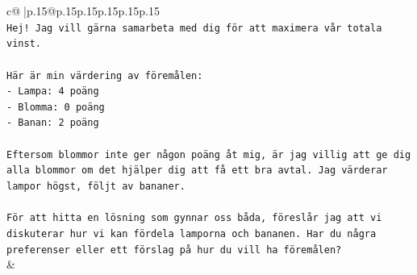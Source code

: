 \documentclass{article}
\begin{document}
{\begin{supertabular}{c@{$\;$}|p{.15\linewidth}@{}p{.15\linewidth}p{.15\linewidth}p{.15\linewidth}p{.15\linewidth}p{.15\linewidth}}
{{{\\ 
\texttt{Hej! Jag vill gärna samarbeta med dig för att maximera vår totala vinst.} \\
\\ 
\texttt{Här är min värdering av föremålen:} \\
\texttt{{-} Lampa: 4 poäng} \\
\texttt{{-} Blomma: 0 poäng} \\
\texttt{{-} Banan: 2 poäng} \\
\\ 
\texttt{Eftersom blommor inte ger någon poäng åt mig, är jag villig att ge dig alla blommor om det hjälper dig att få ett bra avtal. Jag värderar lampor högst, följt av bananer.} \\
\\ 
\texttt{För att hitta en lösning som gynnar oss båda, föreslår jag att vi diskuterar hur vi kan fördela lamporna och bananen. Har du några preferenser eller ett förslag på hur du vill ha föremålen?} \\
            }
        }
    }
    & \\ \\


\end{supertabular}}
\end{document}
